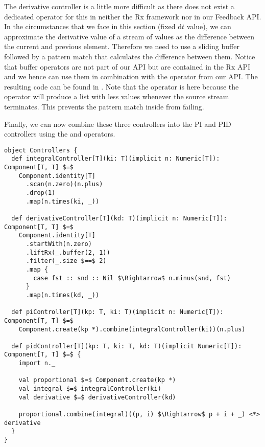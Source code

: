 The derivative controller is a little more difficult as there does not exist a dedicated operator for this in neither the Rx framework nor in our Feedback API. In the circumstances that we face in this section (fixed $\mathrm{d} t$ value), we can approximate the derivative value of a stream of values as the difference between the current and previous element. Therefore we need to use a sliding buffer followed by a pattern match that calculates the difference between them. Notice that buffer operators are not part of our API but are contained in the Rx API and we hence can use them in combination with the  operator from our API. The resulting code can be found in . Note that the  operator is here because the  operator will produce a list with less values whenever the source stream terminates. This prevents the pattern match inside  from failing.

Finally, we can now combine these three controllers into the PI and PID controllers using the  and \code{<*>} operators.

\hspace*{-\parindent}
\begin{minipage}{\linewidth}
\begin{lstlisting}[style=ScalaStyle, caption={Implementation of the various commonly used controllers}, label={lst:controller-implementations}]
object Controllers {
  def integralController[T](ki: T)(implicit n: Numeric[T]): Component[T, T] $=$
    Component.identity[T]
      .scan(n.zero)(n.plus)
      .drop(1)
      .map(n.times(ki, _))

  def derivativeController[T](kd: T)(implicit n: Numeric[T]): Component[T, T] $=$
    Component.identity[T]
      .startWith(n.zero)
      .liftRx(_.buffer(2, 1))
      .filter(_.size $==$ 2)
      .map {
        case fst :: snd :: Nil $\Rightarrow$ n.minus(snd, fst)
      }
      .map(n.times(kd, _))
  
  def piController[T](kp: T, ki: T)(implicit n: Numeric[T]): Component[T, T] $=$
    Component.create(kp *).combine(integralController(ki))(n.plus)
  
  def pidController[T](kp: T, ki: T, kd: T)(implicit Numeric[T]): Component[T, T] $=$ {
    import n._
    
    val proportional $=$ Component.create(kp *)
    val integral $=$ integralController(ki)
    val derivative $=$ derivativeController(kd)
    
    proportional.combine(integral)((p, i) $\Rightarrow$ p + i + _) <*> derivative
  }
}
\end{lstlisting}
\end{minipage}

